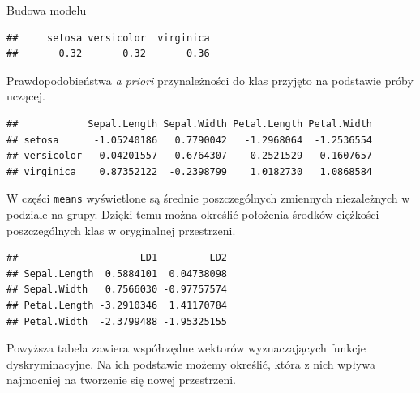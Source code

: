 \documentclass[
]{book}
\newenvironment{Shaded}{\begin{snugshade}}{\end{snugshade}}
\newcommand{\DataTypeTok}[1]{\textcolor[rgb]{0.13,0.29,0.53}{#1}}
\newcommand{\KeywordTok}[1]{\textcolor[rgb]{0.13,0.29,0.53}{\textbf{#1}}}
\newcommand{\NormalTok}[1]{#1}
\newcommand{\OperatorTok}[1]{\textcolor[rgb]{0.81,0.36,0.00}{\textbf{#1}}}
\newcommand{\StringTok}[1]{\textcolor[rgb]{0.31,0.60,0.02}{#1}}
\theoremstyle{plain}
\theoremstyle{definition}
\theoremstyle{definition}
\theoremstyle{definition}
\theoremstyle{definition}
\theoremstyle{remark}
\begin{document}
Budowa modelu

\begin{Shaded}
\end{Shaded}

\begin{verbatim}
##     setosa versicolor  virginica 
##       0.32       0.32       0.36
\end{verbatim}

Prawdopodobieństwa \emph{a priori} przynależności do klas przyjęto na podstawie próby uczącej.

\begin{Shaded}
\end{Shaded}

\begin{verbatim}
##            Sepal.Length Sepal.Width Petal.Length Petal.Width
## setosa      -1.05240186   0.7790042   -1.2968064  -1.2536554
## versicolor   0.04201557  -0.6764307    0.2521529   0.1607657
## virginica    0.87352122  -0.2398799    1.0182730   1.0868584
\end{verbatim}

W części \texttt{means} wyświetlone są średnie poszczególnych zmiennych niezależnych w podziale na grupy. Dzięki temu można określić położenia środków ciężkości poszczególnych klas w oryginalnej przestrzeni.

\begin{Shaded}
\end{Shaded}

\begin{verbatim}
##                     LD1         LD2
## Sepal.Length  0.5884101  0.04738098
## Sepal.Width   0.7566030 -0.97757574
## Petal.Length -3.2910346  1.41170784
## Petal.Width  -2.3799488 -1.95325155
\end{verbatim}

Powyższa tabela zawiera współrzędne wektorów wyznaczających funkcje dyskryminacyjne. Na ich podstawie możemy określić, która z nich wpływa najmocniej na tworzenie się nowej przestrzeni.
\end{document}
